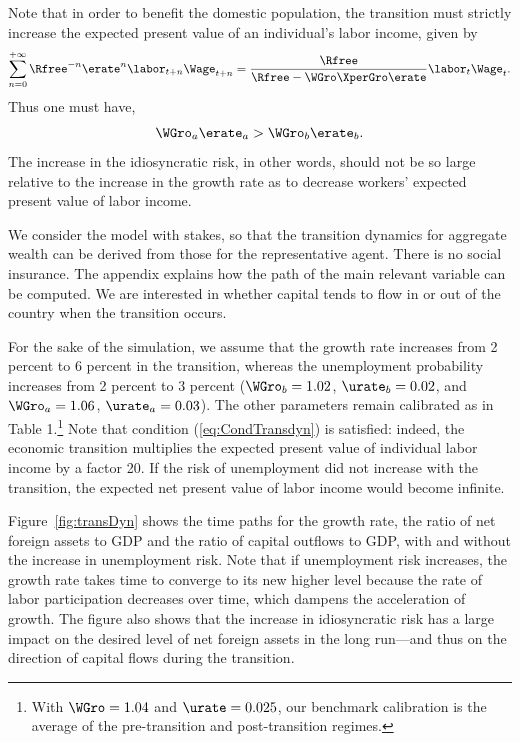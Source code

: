 \documentclass[titlepage]{\econtex}\newcommand{\texname}{cjSOE}
\begin{document}
Note that in order to benefit the domestic population, the transition must strictly increase the expected present value of an individual's labor income, given by
\begin{equation*}
\sum_{n=0}^{+\infty} \Rfree^{-n} \erate^{n} \labor_{t+n} \Wage_{t+n}= \frac{\Rfree}{\Rfree- \WGro \XperGro \erate} \labor_t \Wage_t.
\end{equation*}
Thus one must have,
\begin{equation}
\WGro_a \erate_a >\WGro_b \erate_b.
\label{eq:CondTransdyn}
\end{equation}
The increase in the idiosyncratic risk, in other words, should not be so large relative to the increase in the growth rate as to decrease workers' expected present value of labor income.

We consider the model with stakes, so that the transition dynamics for aggregate wealth can be derived from those for the representative agent. There is no social insurance. The appendix explains how the path of the main relevant variable can be computed. We are interested in whether capital tends to flow in or out of the country when the transition occurs.

For the sake of the simulation, we assume that the growth rate
increases from 2 percent to 6 percent in the transition, whereas the
unemployment probability increases from 2 percent to 3 percent
($\WGro_b=1.02$, $\urate_b=0.02$, and $\WGro_a=1.06$,
$\urate_a=0.03$). The other parameters remain calibrated as in Table
1.\footnote{With $\WGro=1.04$ and $\urate=0.025$, our benchmark
  calibration is the average of the pre-transition and post-transition
  regimes.} Note that condition (\ref{eq:CondTransdyn}) is satisfied:
indeed, the economic transition multiplies the expected present value
of individual labor income by a factor 20. If the risk of unemployment
did not increase with the transition, the expected net present value
of labor income would become infinite.

Figure~\ref{fig:transDyn} shows the time paths for the growth rate,
the ratio of net foreign assets to GDP and the ratio of capital
outflows to GDP, with and without the increase in unemployment
risk. Note that if unemployment risk increases, the growth rate takes
time to converge to its new higher level because the rate of labor
participation decreases over time, which dampens the acceleration of
growth. The figure also shows that the increase in idiosyncratic risk
has a large impact on the desired level of net foreign assets in the
long run---and thus on the direction of capital flows during the
transition. 
\end{document}
